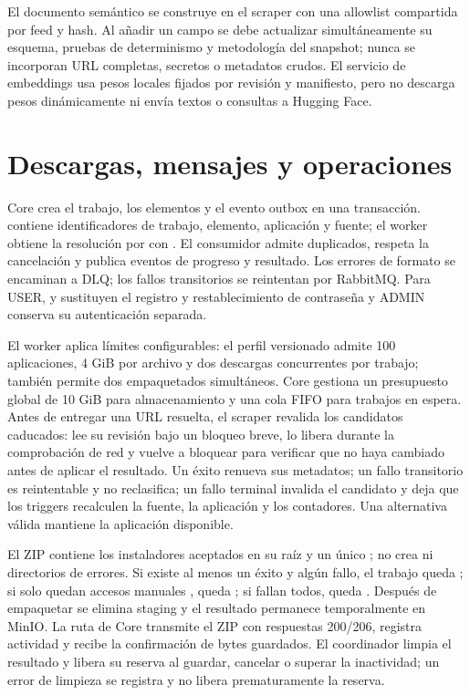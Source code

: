 El documento semántico se construye en el scraper con una allowlist compartida por feed y hash. Al añadir un campo se debe actualizar simultáneamente su esquema, pruebas de determinismo y metodología del snapshot; nunca se incorporan URL completas, secretos o metadatos crudos. El servicio de embeddings usa pesos locales fijados por revisión y manifiesto, pero no descarga pesos dinámicamente ni envía textos o consultas a Hugging Face.

\section{Descargas, mensajes y operaciones}

Core crea el trabajo, los elementos y el evento outbox en una transacción.  contiene identificadores de trabajo, elemento, aplicación y fuente; el worker obtiene la resolución por  con . El consumidor admite duplicados, respeta la cancelación y publica eventos de progreso y resultado. Los errores de formato se encaminan a DLQ; los fallos transitorios se reintentan por RabbitMQ. Para USER,  y  sustituyen el registro y restablecimiento de contraseña y ADMIN conserva su autenticación separada.

El worker aplica límites configurables: el perfil versionado admite 100 aplicaciones, 4 GiB por archivo y dos descargas concurrentes por trabajo; también permite dos empaquetados simultáneos. Core gestiona un presupuesto global de 10 GiB para almacenamiento y una cola FIFO para trabajos en espera. Antes de entregar una URL resuelta, el scraper revalida los candidatos caducados: lee su revisión bajo un bloqueo breve, lo libera durante la comprobación de red y vuelve a bloquear para verificar que no haya cambiado antes de aplicar el resultado. Un éxito renueva sus metadatos; un fallo transitorio es reintentable y no reclasifica; un fallo terminal invalida el candidato y deja que los triggers recalculen la fuente, la aplicación y los contadores. Una alternativa válida mantiene la aplicación disponible.

El ZIP contiene los instaladores aceptados en su raíz y un único ; no crea  ni directorios de errores. Si existe al menos un éxito y algún fallo, el trabajo queda ; si solo quedan accesos manuales , queda ; si fallan todos, queda . Después de empaquetar se elimina staging y el resultado permanece temporalmente en MinIO. La ruta de Core transmite el ZIP con respuestas 200/206, registra actividad y recibe la confirmación de bytes guardados. El coordinador limpia el resultado y libera su reserva al guardar, cancelar o superar la inactividad; un error de limpieza se registra y no libera prematuramente la reserva.


